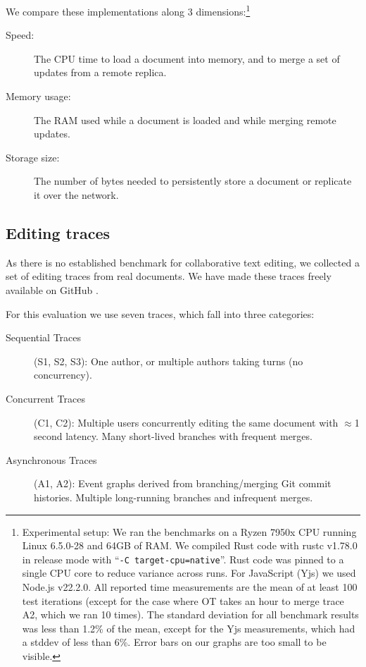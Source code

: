 \documentclass[sigplan,10pt]{acmart}
\begin{document}
We compare these implementations along 3 dimensions:\footnote{Experimental setup: We ran the benchmarks on a Ryzen 7950x CPU running Linux 6.5.0-28 and 64GB of RAM.
We compiled Rust code with rustc v1.78.0 in release mode with ``\texttt{-C target-cpu=native}''. Rust code was pinned to a single CPU core to reduce variance across runs. %
For JavaScript (Yjs) we used Node.js v22.2.0. %
All reported time measurements are the mean of at least 100 test iterations (except for the case where OT takes an hour to merge trace A2, which we ran 10 times).
The standard deviation for all benchmark results was less than 1.2\% of the mean, except for the Yjs measurements, which had a stddev of less than 6\%. Error bars on our graphs are too small to be visible.}

\begin{description}
\item[Speed:] The CPU time to load a document into memory, and to merge a set of updates from a remote replica.
\item[Memory usage:] The RAM used while a document is loaded and while merging remote updates.
\item[Storage size:] The number of bytes needed to persistently store a document or replicate it over the network.
\end{description}

\subsection{Editing traces}

As there is no established benchmark for collaborative text editing, we collected a set of editing traces from real documents.
We have made these traces freely available on GitHub \cite{editing-traces}.

For this evaluation we use seven traces, which fall into three categories:

\begin{description}
\item[Sequential Traces] (S1, S2, S3): One author, or multiple authors taking turns (no concurrency).
\item[Concurrent Traces] (C1, C2): Multiple users concurrently editing the same document with $\approx$1 second latency. Many short-lived branches with frequent merges.
\item[Asynchronous Traces] (A1, A2): Event graphs derived from branching/merging Git commit histories. Multiple long-running branches and infrequent merges.
\end{description}
\end{document}

